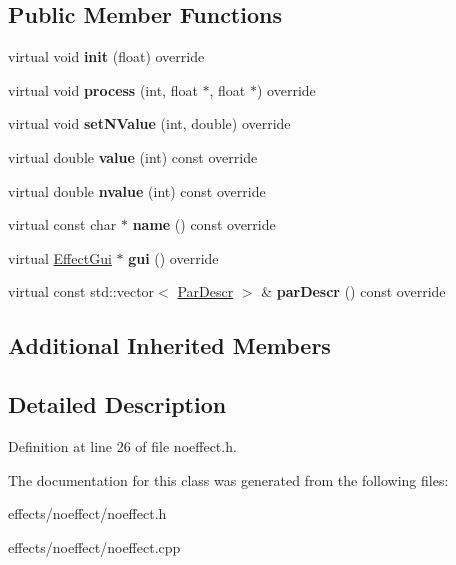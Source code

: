 \subsection*{Public Member Functions}
\begin{DoxyCompactItemize}
\item 
\mbox{\label{class_ms_1_1_no_effect_afb7ec9af218814ad878e1196d8c986ca}} 
virtual void {\bfseries init} (float) override
\item 
\mbox{\label{class_ms_1_1_no_effect_a50b51f6b3f6450eb8564f87a281d8dc4}} 
virtual void {\bfseries process} (int, float $\ast$, float $\ast$) override
\item 
\mbox{\label{class_ms_1_1_no_effect_a0a745dbdd3d23fbb52819a8a97d7190d}} 
virtual void {\bfseries set\+N\+Value} (int, double) override
\item 
\mbox{\label{class_ms_1_1_no_effect_a41176cee2872b26f1a1fc140868995a2}} 
virtual double {\bfseries value} (int) const override
\item 
\mbox{\label{class_ms_1_1_no_effect_a822e6de1c3ff7f1833a45eed99d5b425}} 
virtual double {\bfseries nvalue} (int) const override
\item 
\mbox{\label{class_ms_1_1_no_effect_a1ef1df41aa14e10e97187a8bfb34322e}} 
virtual const char $\ast$ {\bfseries name} () const override
\item 
\mbox{\label{class_ms_1_1_no_effect_ad02a6aaaa24e666e1c66ccc842863ba0}} 
virtual \hyperlink{class_ms_1_1_effect_gui}{Effect\+Gui} $\ast$ {\bfseries gui} () override
\item 
\mbox{\label{class_ms_1_1_no_effect_a16b63661133183eb3a1b1d1b791a1593}} 
virtual const std\+::vector$<$ \hyperlink{struct_ms_1_1_par_descr}{Par\+Descr} $>$ \& {\bfseries par\+Descr} () const override
\end{DoxyCompactItemize}
\subsection*{Additional Inherited Members}


\subsection{Detailed Description}


Definition at line 26 of file noeffect.\+h.



The documentation for this class was generated from the following files\+:\begin{DoxyCompactItemize}
\item 
effects/noeffect/noeffect.\+h\item 
effects/noeffect/noeffect.\+cpp\end{DoxyCompactItemize}
